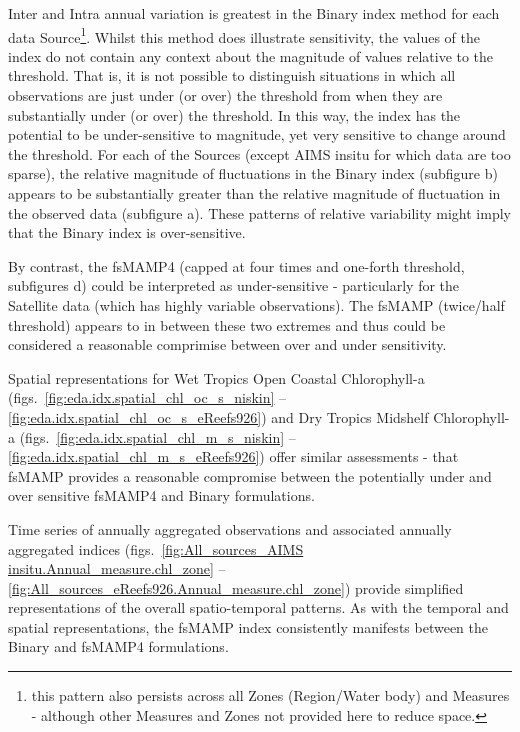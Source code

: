 Inter and Intra annual variation is greatest in the Binary index method for each data
Source\footnote{this pattern also persists across all Zones (Region/Water body) and Measures -
although other Measures and Zones not provided here to reduce space.}.  Whilst this method does
illustrate sensitivity, the values of the index do not contain any context about the magnitude of
values relative to the threshold.  That is, it is not possible to distinguish situations in which
all observations are just under (or over) the threshold from when they are substantially under (or
over) the threshold. In this way, the index has the potential to be under-sensitive to magnitude,
yet very sensitive to change around the threshold.  For each of the Sources (except AIMS insitu for
which data are too sparse), the relative magnitude of fluctuations in the Binary index (subfigure b)
appears to be substantially greater than the relative magnitude of fluctuation in the observed data
(subfigure a).  These patterns of relative variability might imply that the Binary index is
over-sensitive.

By contrast, the fsMAMP4 (capped at four times and one-forth threshold, subfigures d) could be
interpreted as under-sensitive - particularly for the Satellite data (which has highly variable
observations).  The fsMAMP (twice/half threshold) appears to in between these two extremes and thus
could be considered a reasonable comprimise between over and under sensitivity.

Spatial representations for Wet Tropics Open Coastal Chlorophyll-a
(figs.~\ref{fig:eda.idx.spatial_chl_oc_s_niskin} -- \ref{fig:eda.idx.spatial_chl_oc_s_eReefs926})
and Dry Tropics Midshelf Chlorophyll-a (figs.~\ref{fig:eda.idx.spatial_chl_m_s_niskin} --
\ref{fig:eda.idx.spatial_chl_m_s_eReefs926}) offer similar assessments - that fsMAMP provides a
reasonable compromise between the potentially under and over sensitive fsMAMP4 and Binary
formulations.

Time series of annually aggregated observations and associated annually aggregated indices
(figs.~\ref{fig:All_sources_AIMS insitu.Annual_measure.chl_zone} --
\ref{fig:All_sources_eReefs926.Annual_measure.chl_zone}) provide simplified representations of the
overall spatio-temporal patterns.  As with the temporal and spatial representations, the fsMAMP
index consistently manifests between the Binary and fsMAMP4 formulations.



